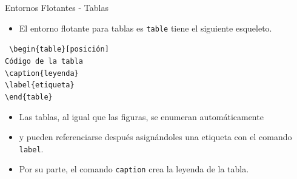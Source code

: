 \documentclass[12pt]{beamer}
\begin{document}
\begin{frame}{Entornos Flotantes - Tablas}
  \begin{itemize}
    \item El entorno flotante para tablas es \texttt{\color{blue}table} tiene el siguiente esqueleto.
  \end{itemize}
  \begin{center}
    \begin{minipage}{0.9\textwidth}
      \footnotesize
      \texttt{\color{blue}
      \textbackslash begin\{table\}[posición]\\
      Código de la tabla\\
      \textbackslash caption\{leyenda\}\\
      \textbackslash label\{etiqueta\}\\
      \textbackslash end\{table\}}
    \end{minipage}
  \end{center}
  \begin{itemize}
    \item<2-> Las tablas, al igual que las figuras, se enumeran automáticamente
    \item<3-> y pueden referenciarse después asignándoles una etiqueta con el comando \texttt{\color{blue}label}.
    \item <4-> Por su parte, el comando \texttt{\color{blue}caption} crea la leyenda de la tabla.
  \end{itemize}
\end{frame}  
\end{document}
